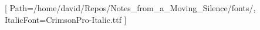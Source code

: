 \setmainfont{CrimsonPro-Regular.ttf}[
  Path=/home/david/Repos/Notes_from_a_Moving_Silence/fonts/,
  ItalicFont=CrimsonPro-Italic.ttf
]
